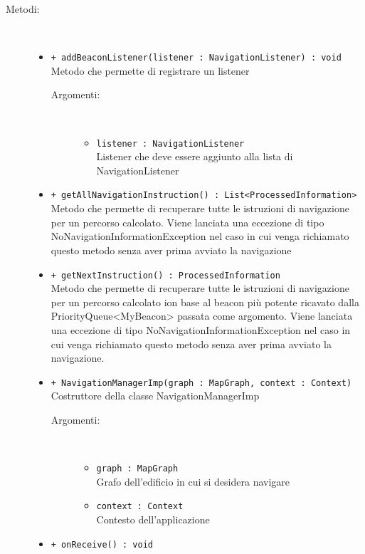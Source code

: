 \documentclass[../DefinizioneDiProdotto.tex]{subfiles}
\begin{document}
\begin{description}
\begin{itemize}
\end{itemize}
\item[Metodi:] \
\begin{itemize}
\item \texttt{+ addBeaconListener(listener : NavigationListener) : void}\\
Metodo che permette di registrare un listener
 \begin{description}
\item[Argomenti:] \
\begin{itemize}
\item \texttt{listener : NavigationListener}\\
Listener che deve essere aggiunto alla lista di NavigationListener\end{itemize}
\end{description}
\item \texttt{+ getAllNavigationInstruction() : List<ProcessedInformation>}\\
Metodo che permette di recuperare tutte le istruzioni di navigazione per un percorso calcolato. Viene lanciata una eccezione di tipo NoNavigationInformationException nel caso in cui venga richiamato questo metodo senza aver prima avviato la navigazione
 \item \texttt{+ getNextInstruction() : ProcessedInformation}\\
Metodo che permette di recuperare tutte le istruzioni di navigazione per un percorso calcolato ion base al beacon più potente ricavato dalla PriorityQueue<MyBeacon> passata come argomento. Viene lanciata una eccezione di tipo NoNavigationInformationException nel caso in cui venga richiamato questo metodo senza aver prima avviato la navigazione.
 \item \texttt{+ NavigationManagerImp(graph : MapGraph, context : Context)}\\
Costruttore della classe NavigationManagerImp
 \begin{description}
\item[Argomenti:] \
\begin{itemize}
\item \texttt{graph : MapGraph}\\
Grafo dell'edificio in cui si desidera navigare\item \texttt{context : Context}\\
Contesto dell'applicazione\end{itemize}
\end{description}
\item \texttt{+ onReceive() : void}\\

\end{itemize}
\end{description}
\end{document}

